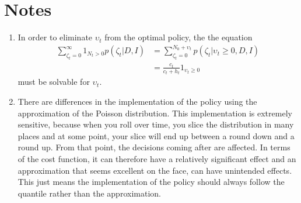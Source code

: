\section{Notes}
\begin{enumerate}
	\item In order to eliminate $\upsilon_t$ from the optimal policy, the the equation
	\begin{equation}
		\begin{split}
			\sum_{\zeta_t=0}^\infty1_{N_t> 0}p(\zeta_t| D, I)&= \sum_{\zeta_t=0}^{N_0+\upsilon_t} p(\zeta_t|\upsilon_t\geq 0, D, I)\\
			&=\frac{c_t}{c_t+h_t}1_{\upsilon_t\geq 0}
		\end{split}
	\end{equation}
	must be solvable for $\upsilon_t$. 
	
	\item There are differences in the implementation of the policy using the approximation of the Poisson distribution. This implementation is extremely sensitive, because when you roll over time, you slice the distribution in many places and at some point, your slice will end up between a round down and a round up. From that point, the decisions coming after are affected. In terms of the cost function, it can therefore have a relatively significant effect and an approximation that seems excellent on the face, can have unintended effects. This just means the implementation of the policy should always follow the quantile rather than the approximation.
\end{enumerate}

